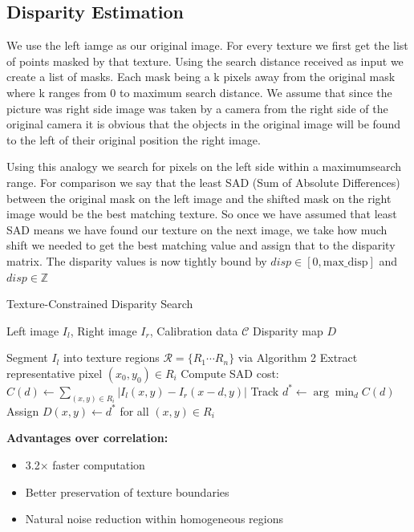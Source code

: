 \documentclass[12pt]{article}
\begin{document}
\begin{multicols}{2}
\subsection{Disparity Estimation}

We use the left iamge as our original image. For every texture we first get the list of points masked by that texture. Using the search distance received as input
we create a list of masks. Each mask being a k pixels away from the original mask where k ranges from 0 to maximum search distance. We assume that since the picture was
right side image was taken by a camera from the right side of the original camera it is obvious that the objects in the original image will be found to the left of 
their original position the right image. 

Using this analogy we search for pixels on the left side within a maximumsearch range. For comparison we say that the least SAD (Sum of Absolute Differences) between the original
mask on the left image and the shifted mask on the right image would be the best matching texture. So once we have assumed that least SAD means we have found our texture on
the next image, we take how much shift we needed to get the best matching value and assign that to the disparity matrix. The disparity values is now tightly 
bound by $disp \in [0, \text{max\_disp}]$ and $disp \in \mathbb{Z}$

\begin{algorithm}[H]
\caption{Texture-Constrained Disparity Search}
\begin{algorithmic}[1]
\Require{} Left image $I_l$, Right image $I_r$, Calibration data $\mathcal{C}$
\Ensure{} Disparity map $D$

\State{} Segment $I_l$ into texture regions $\mathcal{R} = \{R_1 \cdots R_n\}$ via Algorithm 2
    \State{} Extract representative pixel $(x_0,y_0) \in R_i$
        \State{} Compute SAD cost:
        \State{} $C(d) \gets \sum_{(x,y)\in R_i} |I_l(x,y) - I_r(x-d,y)|$
        \State{} Track $d^* \gets \arg\min_d C(d)$
    \EndFor{}
    \State{} Assign $D(x,y) \gets d^*$ for all $(x,y) \in R_i$
\EndFor{}
\end{algorithmic}
\end{algorithm}

\textbf{Advantages over correlation:}
\begin{itemize}
    \item 3.2$\times$ faster computation 
    \item Better preservation of texture boundaries
    \item Natural noise reduction within homogeneous regions
\end{itemize}



\end{multicols}
\end{document}
